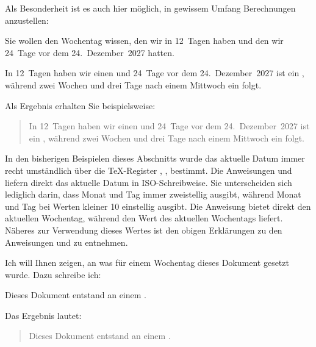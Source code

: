Als Besonderheit ist es auch hier möglich, in gewissem Umfang Berechnungen
anzustellen:
\begin{Example}
  Sie wollen den Wochentag wissen, den wir in 12~Tagen haben und
  den wir 24~Tage vor dem 24.~Dezember~2027 hatten.
\begin{lstcode}
  In 12~Tagen haben wir einen 
   und
  24~Tage vor dem 24.~Dezember~2027 ist ein
  , während zwei Wochen 
  und drei Tage nach einem Mittwoch ein 
   folgt.
\end{lstcode}
  Als Ergebnis erhalten Sie beispielsweise:
  \begin{quote}
  In 12~Tagen haben wir einen 
   und
  24~Tage vor dem 24.~Dezember~2027 ist ein
  , während
  zwei Wochen und drei Tage nach
  einem Mittwoch ein 
  folgt.
  \end{quote}
\end{Example}%
%
\EndIndexGroup


\begin{Declaration}
\end{Declaration}%
In den bisherigen Beispielen dieses Abschnitts wurde das aktuelle Datum immer
recht umständlich über die \TeX-Register ,
,  bestimmt. Die
Anweisungen  und
 liefern direkt das aktuelle Datum in ISO-Schreibweise. Sie
unterscheiden sich lediglich darin, dass  Monat und Tag immer
zweistellig ausgibt, während  Monat und Tag bei Werten kleiner
10 einstellig ausgibt. Die Anweisung  bietet direkt den
aktuellen Wochentag, während  den Wert des aktuellen
Wochentags liefert. Näheres zur Verwendung dieses Wertes ist den obigen
Erklärungen zu den Anweisungen  und  zu
entnehmen.

\begin{Example}
  Ich will Ihnen zeigen, an was für einem Wochentag dieses Dokument gesetzt
  wurde. Dazu schreibe ich:
\begin{lstcode}
  Dieses Dokument entstand an einem \todaysname.
\end{lstcode}
  Das Ergebnis lautet:
  \begin{quote}
  Dieses Dokument entstand an einem \todaysname.
  \end{quote}
\end{Example}

